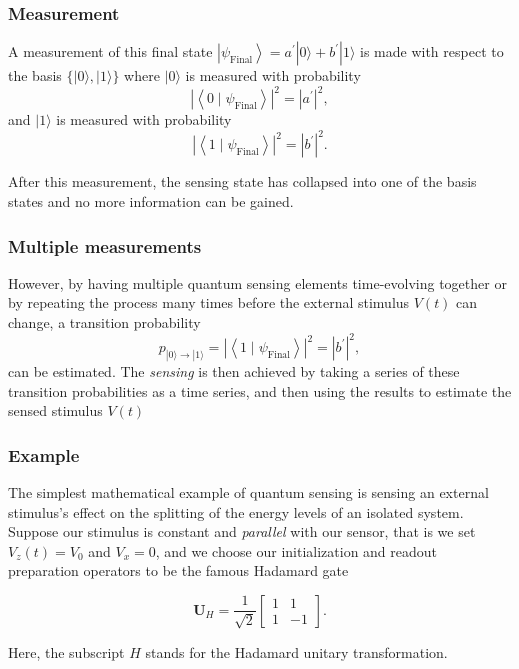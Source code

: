 \documentclass{beamer}
\begin{document}
\begin{frame}
\frametitle{Measurement}

A measurement of this final state $\left|\psi_{\mathrm{Final}}\right\rangle=a^{\prime}|0\rangle+b^{\prime}|1\rangle$ is made with
respect to the basis $\{|0\rangle,|1\rangle\}$ where
$|0\rangle$ is measured with  probability
\[
\left|\left\langle 0 \mid \psi_{\mathrm{Final}}\right\rangle\right|^{2}=\left|a^{\prime}\right|^{2},
\]
and $|1\rangle$ is measured with probability 
\[
\left|\left\langle 1 \mid\psi_{\mathrm{Final}}\right\rangle\right|^{2}=\left|b^{\prime}\right|^{2}.
\]

After this measurement, the sensing state has collapsed into one
of the basis states and  no more information can be gained.
\end{frame}

\begin{frame}
\frametitle{Multiple measurements}

However, by having
multiple quantum sensing elements time-evolving together or by
repeating the process many times before the external stimulus $V(t)$
can change, a transition probability
\[
p_{|0\rangle\rightarrow|1\rangle}=\left|\left\langle 1 \mid \psi_{\mathrm{Final}}\right\rangle\right|^{2}=\left|b^{\prime}\right|^{2},
\]
can be estimated. The \emph{sensing} is then achieved by taking a
series of these transition probabilities as a time series, and then
using the results to estimate the sensed stimulus $V(t)$
\end{frame}

\begin{frame}
\frametitle{Example}

The simplest mathematical example of quantum sensing is sensing an
external stimulus's effect on the splitting of the energy levels of an
isolated system. Suppose our stimulus is constant and \emph{parallel} with
our sensor, that is we set  $V_z(t)=V_{0}$ and $V_x=0$, and we choose
our initialization and readout preparation operators to be the famous
Hadamard gate

\[
\bm{U}_{H}=\frac{1}{\sqrt{2}}\left[\begin{array}{cc}
1 & 1 \\
1 & -1
\end{array}\right].
\]

Here, the subscript $H$ stands for the Hadamard unitary transformation.
\end{frame}
\end{document}
